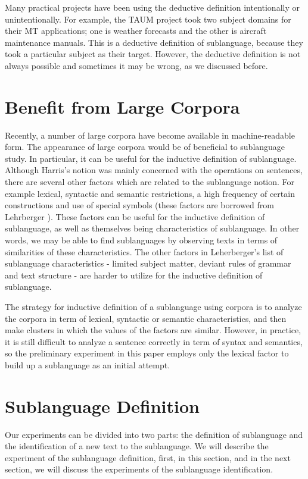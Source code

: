 Many practical projects have been using the deductive definition
intentionally or unintentionally.
For example, the TAUM project took two subject domains for their MT applications;
one is weather forecasts and the other is aircraft maintenance manuals.
This is a deductive definition of sublanguage, 
because they took a particular subject as their target.
However, the deductive definition is not always possible and
sometimes it may be wrong, as we discussed before.


\section{Benefit from Large Corpora}

Recently, a number of large corpora have become available in machine-readable form.
The appearance of large corpora would be of beneficial to sublanguage study.
In particular, it can be useful for the inductive definition of sublanguage.
Although Harris's notion was mainly concerned with the operations on sentences,
there are several other factors which are related to the sublanguage notion.
For example lexical, syntactic and semantic restrictions,
a high frequency of certain constructions and use of special symbols
(these factors are borrowed from Lehrberger \cite{Lehrberger:82}).
These factors can be useful for the inductive definition of sublanguage, as well as 
themselves being characteristics of sublanguage.
In other words, we may be able to find sublanguages
by observing texts in terms of similarities of these characteristics.
The other factors in Leherberger's list of sublanguage characteristics -
limited subject matter,
deviant rules of grammar and text structure - are harder to utilize
for the inductive definition of sublanguage.

The strategy for inductive definition of a sublanguage using corpora is
to analyze the corpora in term of lexical, syntactic or semantic characteristics, 
and then make clusters in which the values of the factors are similar.
However, in practice, it is still difficult to analyze a sentence correctly 
in term of syntax and semantics,
so the preliminary experiment in this paper employs only the lexical
factor to build up a sublanguage as an initial attempt.


\section{Sublanguage Definition}

Our experiments can be divided into two parts: the definition of sublanguage
and the identification of a new text to the sublanguage. 
We will describe the experiment of the sublanguage definition, first, in this section, 
and in the next section, we will discuss the experiments of
the sublanguage identification.

